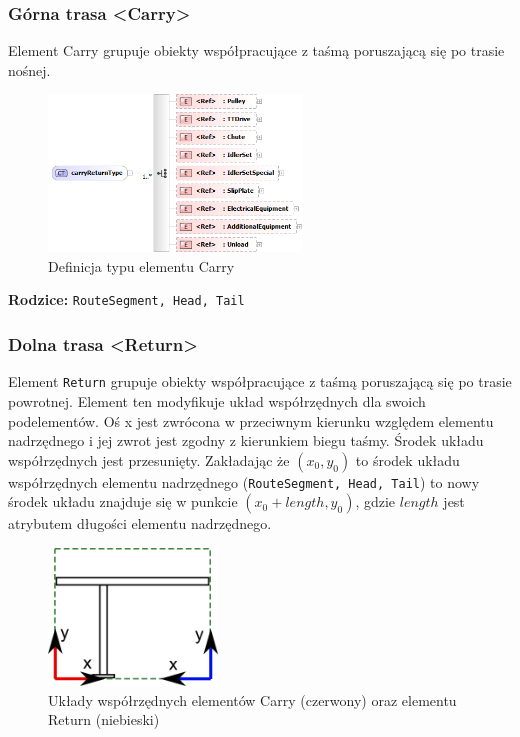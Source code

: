 \documentclass[12pt,a4paper]{article}
\begin{document}
\subsubsection{Górna trasa <Carry>}
Element Carry grupuje obiekty współpracujące z taśmą poruszającą się po trasie
nośnej.

\begin{figure}[H]
  \centering
  \includegraphics[width=0.6\textwidth]{png/liquid/carryReturnType}
  \caption{Definicja typu elementu Carry}
  \label{fig:carryReturnType-xsd}
\end{figure}

\noindent\textbf{Rodzice:} \texttt{RouteSegment, Head, Tail}


\subsubsection{Dolna trasa <Return>}
Element {\tt Return} grupuje obiekty współpracujące z taśmą poruszającą się po
trasie powrotnej.  Element ten modyfikuje układ współrzędnych dla swoich
podelementów.  Oś x jest zwrócona w przeciwnym kierunku względem elementu
nadrzędnego i jej zwrot jest zgodny z kierunkiem biegu taśmy.  Środek układu
współrzędnych jest przesunięty.  Zakładając że $(x_0, y_0)$ to środek układu
współrzędnych elementu nadrzędnego ({\tt RouteSegment, Head, Tail}) to nowy
środek układu znajduje się w punkcie $(x_0 + {length}, y_0)$, gdzie ${length}$
jest atrybutem długości elementu nadrzędnego.

\begin{figure}[H]
  \centering
  \includegraphics[width=0.4\textwidth]{png/carryReturn_drw}
  \caption{Układy współrzędnych elementów Carry (czerwony) oraz
elementu Return (niebieski)}
  \label{fig:carryReturn-drw}
\end{figure}
\end{document}
